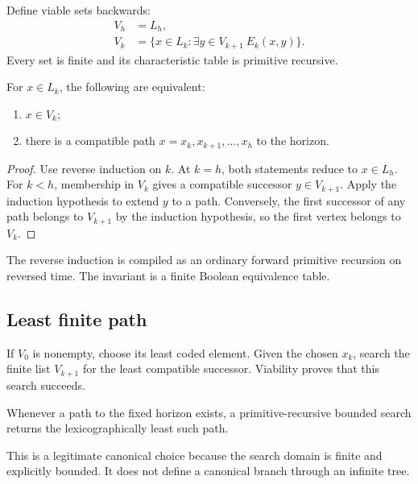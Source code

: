 Define viable sets backwards:
\begin{align*}
 V_h&=L_h,\\
 V_k&=\{x\in L_k:\exists y\in V_{k+1}\ E_k(x,y)\}.
\end{align*}
Every set is finite and its characteristic table is primitive recursive.

\begin{theorem}\label{thm:viability-path}
For \(x\in L_k\), the following are equivalent:
\begin{enumerate}
\item \(x\in V_k\);
\item there is a compatible path \(x=x_k,x_{k+1},\ldots,x_h\) to the horizon.
\end{enumerate}
\end{theorem}

\begin{proof}
Use reverse induction on \(k\).  At \(k=h\), both statements reduce to \(x\in L_h\).  For \(k<h\), membership in \(V_k\) gives a compatible successor \(y\in V_{k+1}\).  Apply the induction hypothesis to extend \(y\) to a path.  Conversely, the first successor of any path belongs to \(V_{k+1}\) by the induction hypothesis, so the first vertex belongs to \(V_k\).
\end{proof}

The reverse induction is compiled as an ordinary forward primitive recursion on reversed time.  The invariant is a finite Boolean equivalence table.

\subsection{Least finite path}

If \(V_0\) is nonempty, choose its least coded element.  Given the chosen \(x_k\), search the finite list \(V_{k+1}\) for the least compatible successor.  Viability proves that this search succeeds.

\begin{corollary}\label{cor:least-finite-path}
Whenever a path to the fixed horizon exists, a primitive-recursive bounded search returns the lexicographically least such path.
\end{corollary}

This is a legitimate canonical choice because the search domain is finite and explicitly bounded.  It does not define a canonical branch through an infinite tree.

